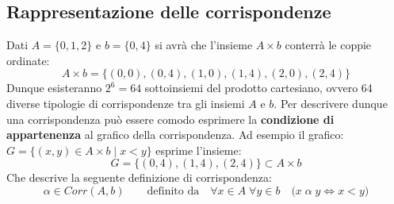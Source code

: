 \subsection{Rappresentazione delle corrispondenze}

\begin{example}
	Dati $A=\{0,1,2\}$ e $b=\{0,4\}$ si avrà che l'insieme $A \times b$ conterrà le coppie ordinate:
	\begin{displaymath}
		A \times b = \{(0,0),(0,4),(1,0),(1,4),(2,0),(2,4)\}
	\end{displaymath}
	Dunque esisteranno $2^{6}=64$ sottoinsiemi del prodotto cartesiano, ovvero 64 diverse tipologie di corrispondenze tra gli insiemi $A$ e $b$. Per descrivere dunque una corrispondenza può essere comodo esprimere la \textbf{condizione di appartenenza} al grafico della corrispondenza. Ad esempio il grafico:	$G = \{(x,y) \in A \times b \; | \; x < y \}$ esprime l'insieme:
	\begin{displaymath}
		G = \{(0,4),(1,4),(2,4)\} \subset A \times b
	\end{displaymath}
	Che descrive la seguente definizione di corrispondenza:
	\begin{displaymath}
		\alpha \in Corr(A,b) \qquad \mbox{definito da} \quad \forall x \in A \; \forall y \in b \quad \bigl( x \; \alpha \; y \iff x <y \bigr)
	\end{displaymath}
\end{example}

